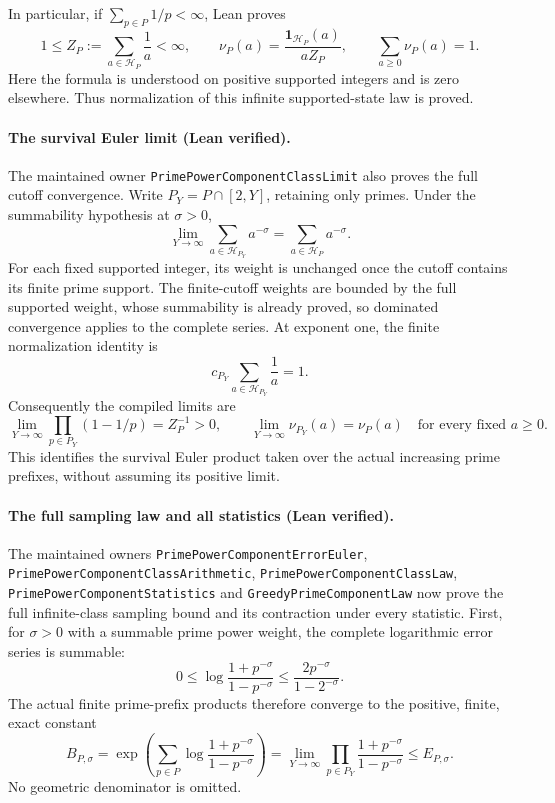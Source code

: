 \documentclass[11pt]{article}
\theoremstyle{definition}
\begin{document}
In particular, if \(\sum_{p\in P}1/p<\infty\), Lean proves
\[
 1\le Z_P:=\sum_{a\in\mathcal H_P}\frac1a<\infty,\qquad
 \nu_P(a)=\frac{\mathbf1_{\mathcal H_P}(a)}{aZ_P},\qquad
 \sum_{a\ge0}\nu_P(a)=1.
\]
Here the formula is understood on positive supported integers and is
zero elsewhere. Thus normalization of this infinite supported-state
law is proved.

\paragraph{The survival Euler limit (Lean verified).}
The maintained owner \texttt{PrimePowerComponentClassLimit} also proves
the full cutoff convergence. Write \(P_Y=P\cap[2,Y]\), retaining only
primes. Under the summability hypothesis at \(\sigma>0\),
\[
 \lim_{Y\to\infty}\sum_{a\in\mathcal H_{P_Y}}a^{-\sigma}
       =\sum_{a\in\mathcal H_P}a^{-\sigma}.
\]
For each fixed supported integer, its weight is unchanged once the
cutoff contains its finite prime support. The finite-cutoff weights
are bounded by the full supported weight, whose summability is already
proved, so dominated convergence applies to the complete series.
At exponent one, the finite normalization identity is
\[
 c_{P_Y}\sum_{a\in\mathcal H_{P_Y}}\frac1a=1.
\]
Consequently the compiled limits are
\[
 \lim_{Y\to\infty}\prod_{p\in P_Y}(1-1/p)
       =Z_P^{-1}>0,\qquad
 \lim_{Y\to\infty}\nu_{P_Y}(a)=\nu_P(a)
                         \quad\text{for every fixed }a\ge0.
\]
This identifies the survival Euler product taken over the actual
increasing prime prefixes, without assuming its positive limit.
\paragraph{The full sampling law and all statistics (Lean verified).}
The maintained owners \texttt{PrimePowerComponentErrorEuler},
\texttt{PrimePowerComponentClassArithmetic},
\texttt{PrimePowerComponentClassLaw},
\texttt{PrimePowerComponentStatistics} and
\texttt{GreedyPrimeComponentLaw} now prove the full infinite-class
sampling bound and its contraction under every statistic.
First, for \(\sigma>0\) with a summable prime power weight, the
complete logarithmic error series is summable:
\[
 0\le\log\frac{1+p^{-\sigma}}{1-p^{-\sigma}}
       \le\frac{2p^{-\sigma}}{1-2^{-\sigma}}.
\]
The actual finite prime-prefix products therefore converge to the
positive, finite, exact constant
\[
 B_{P,\sigma}
 =\exp\left(\sum_{p\in P}
                  \log\frac{1+p^{-\sigma}}{1-p^{-\sigma}}\right)
 =\lim_{Y\to\infty}\prod_{p\in P_Y}
                  \frac{1+p^{-\sigma}}{1-p^{-\sigma}}
 \le E_{P,\sigma}.
\]
No geometric denominator is omitted.
\end{document}
